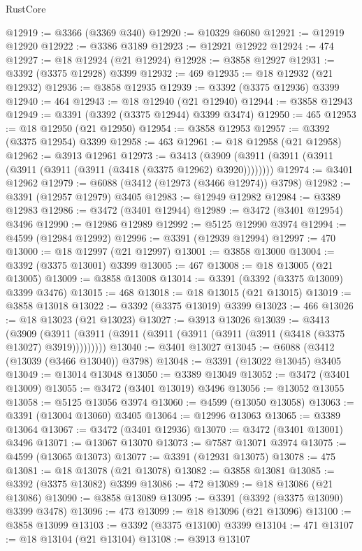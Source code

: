 \begin{lexlean}{RustCore}
\begin{coremodule}
@12919 := @3366 (@3369 @340)
@12920 := @10329 @6080
@12921 := @12919 @12920
@12922 := @3386 @3189
@12923 := @12921 @12922
@12924 := 474
@12927 := @18 @12924 (@21 @12924)
@12928 := @3858 @12927
@12931 := @3392 (@3375 @12928) @3399
@12932 := 469
@12935 := @18 @12932 (@21 @12932)
@12936 := @3858 @12935
@12939 := @3392 (@3375 @12936) @3399
@12940 := 464
@12943 := @18 @12940 (@21 @12940)
@12944 := @3858 @12943
@12949 := @3391 (@3392 (@3375 @12944) @3399 @3474)
@12950 := 465
@12953 := @18 @12950 (@21 @12950)
@12954 := @3858 @12953
@12957 := @3392 (@3375 @12954) @3399
@12958 := 463
@12961 := @18 @12958 (@21 @12958)
@12962 := @3913 @12961
@12973 := @3413 (@3909 (@3911 (@3911 (@3911 (@3911 (@3911 (@3911 (@3418 (@3375 @12962) @3920))))))))
@12974 := @3401 @12962
@12979 := @6088 (@3412 (@12973 (@3466 @12974)) @3798)
@12982 := @3391 (@12957 @12979) @3405
@12983 := @12949 @12982
@12984 := @3389 @12983
@12986 := @3472 (@3401 @12944)
@12989 := @3472 (@3401 @12954) @3496
@12990 := @12986 @12989
@12992 := @5125 @12990 @3974
@12994 := @4599 (@12984 @12992)
@12996 := @3391 (@12939 @12994)
@12997 := 470
@13000 := @18 @12997 (@21 @12997)
@13001 := @3858 @13000
@13004 := @3392 (@3375 @13001) @3399
@13005 := 467
@13008 := @18 @13005 (@21 @13005)
@13009 := @3858 @13008
@13014 := @3391 (@3392 (@3375 @13009) @3399 @3476)
@13015 := 468
@13018 := @18 @13015 (@21 @13015)
@13019 := @3858 @13018
@13022 := @3392 (@3375 @13019) @3399
@13023 := 466
@13026 := @18 @13023 (@21 @13023)
@13027 := @3913 @13026
@13039 := @3413
    (@3909 (@3911 (@3911 (@3911 (@3911 (@3911 (@3911 (@3911 (@3418 (@3375 @13027) @3919)))))))))
@13040 := @3401 @13027
@13045 := @6088 (@3412 (@13039 (@3466 @13040)) @3798)
@13048 := @3391 (@13022 @13045) @3405
@13049 := @13014 @13048
@13050 := @3389 @13049
@13052 := @3472 (@3401 @13009)
@13055 := @3472 (@3401 @13019) @3496
@13056 := @13052 @13055
@13058 := @5125 @13056 @3974
@13060 := @4599 (@13050 @13058)
@13063 := @3391 (@13004 @13060) @3405
@13064 := @12996 @13063
@13065 := @3389 @13064
@13067 := @3472 (@3401 @12936)
@13070 := @3472 (@3401 @13001) @3496
@13071 := @13067 @13070
@13073 := @7587 @13071 @3974
@13075 := @4599 (@13065 @13073)
@13077 := @3391 (@12931 @13075)
@13078 := 475
@13081 := @18 @13078 (@21 @13078)
@13082 := @3858 @13081
@13085 := @3392 (@3375 @13082) @3399
@13086 := 472
@13089 := @18 @13086 (@21 @13086)
@13090 := @3858 @13089
@13095 := @3391 (@3392 (@3375 @13090) @3399 @3478)
@13096 := 473
@13099 := @18 @13096 (@21 @13096)
@13100 := @3858 @13099
@13103 := @3392 (@3375 @13100) @3399
@13104 := 471
@13107 := @18 @13104 (@21 @13104)
@13108 := @3913 @13107

\end{coremodule}
\end{lexlean}
